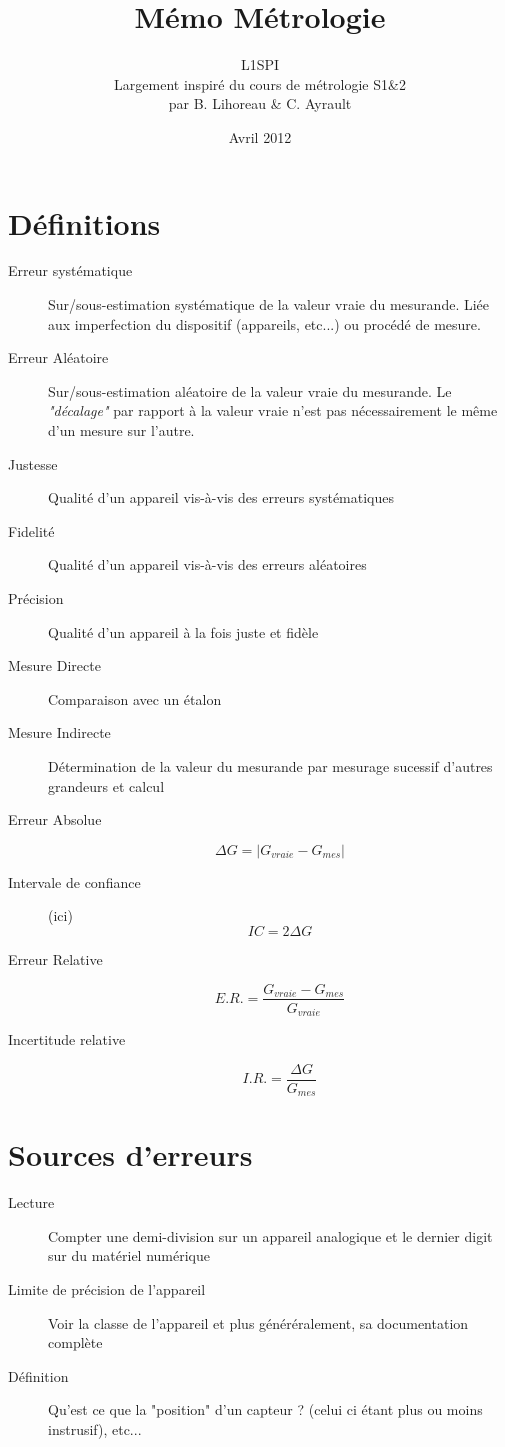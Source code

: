 \documentclass[a4paper, 11pt]{article}
\title{Mémo Métrologie}
\author{L1SPI\\
        Largement inspiré du cours de métrologie S1\&2\\
        par B. Lihoreau \& C. Ayrault}
\date{Avril 2012}
\begin{document}
	\maketitle
	
\section{Définitions}
\begin{description}
    \item[Erreur systématique] Sur/sous-estimation systématique de la valeur vraie du mesurande.
        Liée aux imperfection du dispositif (appareils, etc...) ou procédé de mesure.
    \item[Erreur Aléatoire] Sur/sous-estimation aléatoire de la valeur vraie du mesurande.
        Le {\it "décalage"} par rapport à la valeur vraie n'est pas nécessairement le même d'un mesure sur l'autre.
    \item[Justesse] Qualité d'un appareil vis-à-vis des erreurs systématiques
    \item[Fidelité] Qualité d'un appareil vis-à-vis des erreurs aléatoires
    \item[Précision] Qualité d'un appareil à la fois juste et fidèle
    \item[Mesure Directe] Comparaison avec un étalon
    \item[Mesure Indirecte] Détermination de la valeur du mesurande par mesurage sucessif d'autres grandeurs et calcul 
    \item[Erreur Absolue] $$\Delta G = \left| G_{vraie} - G_{mes} \right|$$
    \item[Intervale de confiance] (ici) $$IC = 2\Delta G$$
    \item[Erreur Relative] $$E.R. = \frac{G_{vraie} - G_{mes}}{G_{vraie}}$$
    \item[Incertitude relative] $$I.R. = \frac{\Delta G}{G_{mes}}$$
\end{description}

\section{Sources d'erreurs}
\begin{description}
    \item[Lecture] Compter une demi-division sur un appareil analogique et le dernier digit sur du matériel numérique
    \item[Limite de précision de l'appareil] Voir la classe de l'appareil et plus généréralement, sa documentation complète
    \item[Définition] Qu'est ce que la "position" d'un capteur ? (celui ci étant plus ou moins instrusif), etc...
\end{description}
\end{document}
